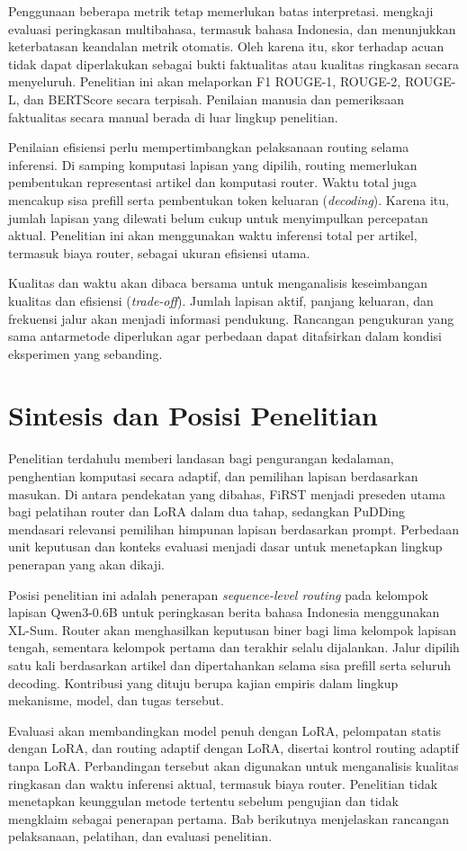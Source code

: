 Penggunaan beberapa metrik tetap memerlukan batas interpretasi. \citet{forde2024multilingeval} mengkaji evaluasi peringkasan multibahasa, termasuk bahasa Indonesia, dan menunjukkan keterbatasan keandalan metrik otomatis. Oleh karena itu, skor terhadap acuan tidak dapat diperlakukan sebagai bukti faktualitas atau kualitas ringkasan secara menyeluruh. Penelitian ini akan melaporkan F1 ROUGE-1, ROUGE-2, ROUGE-L, dan BERTScore secara terpisah. Penilaian manusia dan pemeriksaan faktualitas secara manual berada di luar lingkup penelitian.

Penilaian efisiensi perlu mempertimbangkan pelaksanaan routing selama inferensi. Di samping komputasi lapisan yang dipilih, routing memerlukan pembentukan representasi artikel dan komputasi router. Waktu total juga mencakup sisa prefill serta pembentukan token keluaran (\textit{decoding}). Karena itu, jumlah lapisan yang dilewati belum cukup untuk menyimpulkan percepatan aktual. Penelitian ini akan menggunakan waktu inferensi total per artikel, termasuk biaya router, sebagai ukuran efisiensi utama.

Kualitas dan waktu akan dibaca bersama untuk menganalisis keseimbangan kualitas dan efisiensi (\textit{trade-off}). Jumlah lapisan aktif, panjang keluaran, dan frekuensi jalur akan menjadi informasi pendukung. Rancangan pengukuran yang sama antarmetode diperlukan agar perbedaan dapat ditafsirkan dalam kondisi eksperimen yang sebanding.

\section{Sintesis dan Posisi Penelitian}

Penelitian terdahulu memberi landasan bagi pengurangan kedalaman, penghentian komputasi secara adaptif, dan pemilihan lapisan berdasarkan masukan. Di antara pendekatan yang dibahas, FiRST menjadi preseden utama bagi pelatihan router dan LoRA dalam dua tahap, sedangkan PuDDing mendasari relevansi pemilihan himpunan lapisan berdasarkan prompt. Perbedaan unit keputusan dan konteks evaluasi menjadi dasar untuk menetapkan lingkup penerapan yang akan dikaji.

Posisi penelitian ini adalah penerapan \textit{sequence-level routing} pada kelompok lapisan Qwen3-0.6B untuk peringkasan berita bahasa Indonesia menggunakan XL-Sum. Router akan menghasilkan keputusan biner bagi lima kelompok lapisan tengah, sementara kelompok pertama dan terakhir selalu dijalankan. Jalur dipilih satu kali berdasarkan artikel dan dipertahankan selama sisa prefill serta seluruh decoding. Kontribusi yang dituju berupa kajian empiris dalam lingkup mekanisme, model, dan tugas tersebut.

Evaluasi akan membandingkan model penuh dengan LoRA, pelompatan statis dengan LoRA, dan routing adaptif dengan LoRA, disertai kontrol routing adaptif tanpa LoRA. Perbandingan tersebut akan digunakan untuk menganalisis kualitas ringkasan dan waktu inferensi aktual, termasuk biaya router. Penelitian tidak menetapkan keunggulan metode tertentu sebelum pengujian dan tidak mengklaim sebagai penerapan pertama. Bab berikutnya menjelaskan rancangan pelaksanaan, pelatihan, dan evaluasi penelitian.

